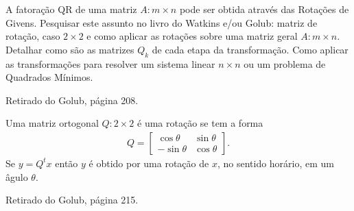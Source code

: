 \documentclass[a4paper,12pt, leqno, answers]{exam}
\begin{document}
\begin{questions}

    \question A fatora\c{c}\~{a}o QR de uma matriz $A :  m \times n$ pode ser obtida atrav\'{e}s das Rota\c{c}\~{o}es de Givens. Pesquisar este assunto no livro do Watkins\nocite{Watkins:2004:fundamentals} e/ou Golub\nocite{Golub:1996:matrix}: matriz de rota\c{c}\~{a}o, caso $2 \times 2$ e como aplicar as rota\c{c}\~{o}es sobre uma matriz geral $A : m \times n$. Detalhar como s\~{a}o as matrizes $Q_k$ de cada etapa da transforma\c{c}\~{a}o. Como aplicar as transforma\c{c}\~{o}es para resolver um sistema linear $n \times n$ ou um problema de Quadrados M\'{i}nimos.
    \begin{solution}
        Retirado do Golub, p\'{a}gina 208.

        Uma matriz ortogonal $Q : 2 \times 2$ \'{e} uma rota\c{c}\~{a}o se tem a forma
        \begin{align*}
            Q = \begin{bmatrix}
                \cos \theta & \sin \theta \\
                -\sin \theta & \cos \theta
            \end{bmatrix}.
        \end{align*}
        Se $y = Q^t x$ ent\~{a}o $y$ \'{e} obtido por uma rota\c{c}\~{a}o de $x$, no sentido hor\'{a}rio, em um \^{a}gulo $\theta$.

        Retirado do Golub, p\'{a}gina 215.


\end{solution}
\end{questions}
\end{document}
